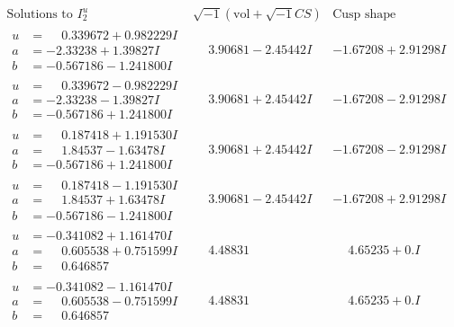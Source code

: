 \documentclass[1p]{elsarticle_modified}
\theoremstyle{definition}
\newcommand{\I}{\sqrt{-1}}
\begin{document}
$$\begin{array}{c|c|c}  
\text{Solutions to }I^u_{2}& \I (\text{vol} + \sqrt{-1}CS) & \text{Cusp shape}\\
 \hline 
\begin{aligned}
u &= \phantom{-}0.339672 + 0.982229 I \\
a &= -2.33238 + 1.39827 I \\
b &= -0.567186 - 1.241800 I\end{aligned}
 & \phantom{-}3.90681 - 2.45442 I & -1.67208 + 2.91298 I \\ \hline\begin{aligned}
u &= \phantom{-}0.339672 - 0.982229 I \\
a &= -2.33238 - 1.39827 I \\
b &= -0.567186 + 1.241800 I\end{aligned}
 & \phantom{-}3.90681 + 2.45442 I & -1.67208 - 2.91298 I \\ \hline\begin{aligned}
u &= \phantom{-}0.187418 + 1.191530 I \\
a &= \phantom{-}1.84537 - 1.63478 I \\
b &= -0.567186 + 1.241800 I\end{aligned}
 & \phantom{-}3.90681 + 2.45442 I & -1.67208 - 2.91298 I \\ \hline\begin{aligned}
u &= \phantom{-}0.187418 - 1.191530 I \\
a &= \phantom{-}1.84537 + 1.63478 I \\
b &= -0.567186 - 1.241800 I\end{aligned}
 & \phantom{-}3.90681 - 2.45442 I & -1.67208 + 2.91298 I \\ \hline\begin{aligned}
u &= -0.341082 + 1.161470 I \\
a &= \phantom{-}0.605538 + 0.751599 I \\
b &= \phantom{-}0.646857\phantom{ +0.000000I}\end{aligned}
 & \phantom{-}4.48831\phantom{ +0.000000I} & \phantom{-}4.65235 + 0. I\phantom{ +0.000000I} \\ \hline\begin{aligned}
u &= -0.341082 - 1.161470 I \\
a &= \phantom{-}0.605538 - 0.751599 I \\
b &= \phantom{-}0.646857\phantom{ +0.000000I}\end{aligned}
 & \phantom{-}4.48831\phantom{ +0.000000I} & \phantom{-}4.65235 + 0. I\phantom{ +0.000000I} \\ \hline\begin{aligned}

\end{aligned}
\end{array}$$
\end{document}
